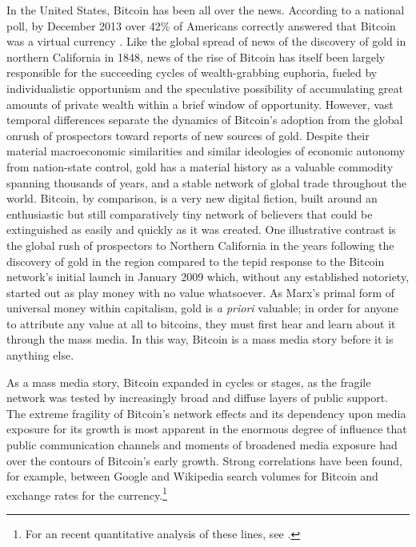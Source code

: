 In the United States, Bitcoin has been all over the news. According to a national poll, by December 2013 over 42\% of Americans correctly answered that Bitcoin was a virtual currency \autocite{Bloomberg13}.
Like the global spread of news of the discovery of gold in northern California in 1848, news of the rise of Bitcoin has itself been largely responsible for the succeeding cycles of wealth-grabbing euphoria, fueled by individualistic opportunism and the speculative possibility of accumulating great amounts of private wealth within a brief window of opportunity. However, vast temporal differences separate the dynamics of Bitcoin's adoption from the global onrush of prospectors toward reports of new sources of gold. Despite their material macroeconomic similarities and similar ideologies of economic autonomy from nation-state control, gold has a material history as a valuable commodity spanning thousands of years, and a stable network of global trade throughout the world. Bitcoin, by comparison, is a very new digital fiction, built around an enthusiastic but still comparatively tiny network of believers that could be extinguished as easily and quickly as it was created. One illustrative contrast is the global rush of prospectors to Northern California in the years following the discovery of gold in the region compared to the tepid response to the Bitcoin network's initial launch in January 2009 which, without any established notoriety, started out as play money with no value whatsoever. As Marx's primal form of universal money within capitalism, gold is \emph{a priori} valuable; in order for anyone to attribute any value at all to bitcoins, they must first hear and learn about it through the mass media. In this way, Bitcoin is a mass media story before it is anything else.

As a mass media story, Bitcoin expanded in cycles or stages, as the fragile network was tested by increasingly broad and diffuse layers of public support. The extreme fragility of Bitcoin's network effects and its dependency upon media exposure for its growth is most apparent in the enormous degree of influence that public communication channels and moments of broadened media exposure had over the contours of Bitcoin's early growth. Strong correlations have been found, for example, between Google and Wikipedia search volumes for Bitcoin and exchange rates for the currency.\footnote{
  For an recent quantitative analysis of these lines, see \autocite{Kristoufek13}.
}

